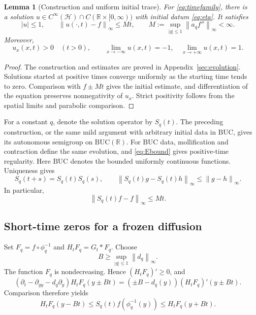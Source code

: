 \documentclass[11pt,reqno]{amsart}
\numberwithin{equation}{section}
\newtheorem{lemma}[theorem]{Lemma}
\theoremstyle{definition}
\theoremstyle{remark}
\newcommand{\R}{\mathbb R}
\newcommand{\HH}{\mathcal H}
\newcommand{\BUC}{\mathrm{BUC}}
\newcommand{\norm}[1]{\left\lVert#1\right\rVert}
\begin{document}
\begin{lemma}[Construction and uniform initial trace]\label{lem:construct}
For \eqref{eq:timefamily}, there is a solution $u\in C^\infty(\HH)\cap C(\R\times[0,\infty))$ with initial datum \eqref{eq:eta}. It satisfies
\begin{equation}\label{eq:traceestimate}
 |u|\leq1,\qquad
 \norm{u(\cdot,t)-f}_\infty\leq Mt,
 \qquad M:=\sup_{|q|\leq1}\norm{a_qf''}_\infty<\infty.
\end{equation}
Moreover,
\begin{equation}\label{eq:monotone}
 u_x(x,t)>0\quad(t>0),\qquad
 \lim_{x\to-\infty}u(x,t)=-1,\quad
 \lim_{x\to+\infty}u(x,t)=1.
\end{equation}
\end{lemma}
\begin{proof}
The construction and estimates are proved in Appendix~\ref{sec:evolution}. Solutions started at positive times converge uniformly as the starting time tends to zero. Comparison with $f\pm Mt$ gives the initial estimate, and differentiation of the equation preserves nonnegativity of $u_x$. Strict positivity follows from the spatial limits and parabolic comparison.
\end{proof}



For a constant $q$, denote the solution operator by $S_q(t)$. The preceding construction, or the same mild argument with arbitrary initial data in $\BUC$, gives its autonomous semigroup on $\BUC(\R)$. For $\BUC$ data, mollification and contraction define the same evolution, and \eqref{eq:Ebound} gives positive-time regularity. Here $\BUC$ denotes the bounded uniformly continuous functions. Uniqueness gives
\begin{equation}\label{eq:semigroup}
 S_q(t+s)=S_q(t)S_q(s),\qquad
 \norm{S_q(t)g-S_q(t)h}_\infty\leq\norm{g-h}_\infty.
\end{equation}
In particular,
\begin{equation}\label{eq:frozeninitial}
 \norm{S_q(t)f-f}_\infty\leq Mt.
\end{equation}

\subsection{Short-time zeros for a frozen diffusion}
Set $F_q=f\circ\phi_q^{-1}$ and $H_tF_q=G_t*F_q$. Choose
\[
 B\geq\sup_{|q|\leq1}\norm{d_q}_\infty.
\]
The function $F_q$ is nondecreasing. Hence $(H_tF_q)'\geq0$, and
\[
 (\partial_t-\partial_{yy}-d_q\partial_y)H_tF_q(y\pm Bt)
 =(\pm B-d_q(y))(H_tF_q)'(y\pm Bt).
\]
Comparison therefore yields
\begin{equation}\label{eq:heatbracket}
 H_tF_q(y-Bt)
 \leq S_q(t)f(\phi_q^{-1}(y))
 \leq H_tF_q(y+Bt).
\end{equation}
\end{document}
